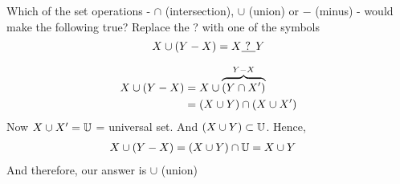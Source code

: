 

\question[3] Which of the set operations - $\cap$ (intersection), $\cup$ (union) or $-$ (minus) - would make 
the following true? Replace the ? with one of the symbols
\[ X\cup(Y-X) = X\underline{\text{   ?   }}Y\]
\watchout

\begin{solution}[\mcq]
  \begin{align}
    X\cup(Y-X) &= X\cup\overbrace{(Y\cap X ')}^{Y-X} \\
           &= (X\cup Y)\cap(X\cup X ') 
  \end{align}
  Now $X\cup X '=\mathbb{U}$ = universal set. And $(X\cup Y)\subset\mathbb{U}$. Hence,
  \begin{align}
    X\cup(Y-X) &= (X\cup Y)\cap\mathbb{U}=X\cup Y
  \end{align}
  And therefore, our answer is $\cup$ (union)
\end{solution}
